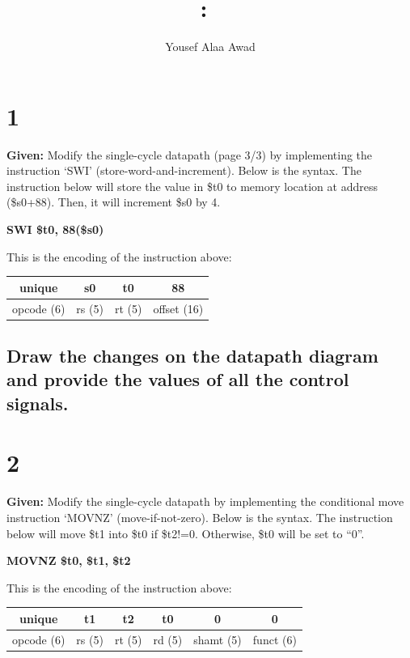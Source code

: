 \documentclass{article}
\title{
    \vspace{2in}
    \textmd{\textbf{\hmwkClass:\ \hmwkTitle}}\\
    \normalsize\vspace{0.1in}
    \vspace{3in}
}
\author{Yousef Alaa Awad}
\begin{document}
\maketitle
\pagebreak

\section{1}
\textbf{Given:} Modify the single-cycle datapath (page 3/3) by implementing the instruction ‘SWI’ (store-word-and-increment). Below is the syntax. The instruction below will store the value in \$t0 to memory location at address (\$s0+88). Then, it will increment \$s0 by 4.
\begin{center}
  \textbf{SWI \$t0, 88(\$s0)}
\end{center}
This is the encoding of the instruction above:
\begin{center}
  \begin{tabular}{|c|c|c|c|}
    \hline
    unique & s0 & t0 & 88 \\
    \hline\hline
    opcode (6) & rs (5) & rt (5) & offset (16) \\
    \hline
  \end{tabular}
\end{center}

\subsection{Draw the changes on the datapath diagram and provide the values of all the control signals.}


\section{2}
\textbf{Given:} Modify the single-cycle datapath by implementing the conditional move instruction ‘MOVNZ’ (move-if-not-zero). Below is the syntax. The instruction below will move \$t1 into \$t0 if \$t2!=0. Otherwise, \$t0 will be set to “0”.
\begin{center}
  \textbf{MOVNZ \$t0, \$t1, \$t2}
\end{center}
This is the encoding of the instruction above:
\begin{center}
  \begin{tabular}{|c|c|c|c|c|c|}
    \hline
    unique & t1 & t2 & t0 & 0 & 0 \\
    \hline\hline
    opcode (6) & rs (5) & rt (5) & rd (5) & shamt (5) & funct (6) \\
    \hline
  \end{tabular}
\end{center}
\end{document}
